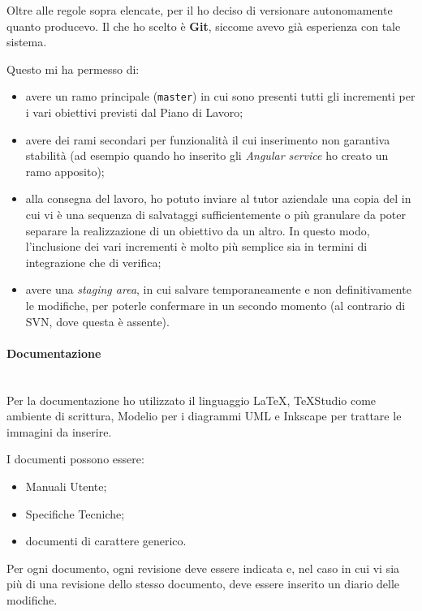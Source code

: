 Oltre alle regole sopra elencate, per il \FREND{} ho deciso di versionare
autonomamente quanto producevo. Il  che ho scelto è \textbf{Git},
siccome avevo già esperienza con tale sistema.

Questo mi ha permesso di:

\begin{itemize}
\item avere un ramo principale (\texttt{master}) in cui sono presenti tutti
  gli incrementi per i vari obiettivi previsti dal Piano di Lavoro;
\item avere dei rami secondari per funzionalità il cui inserimento non
  garantiva stabilità (ad esempio quando ho inserito gli
  \emph{Angular service} ho creato un ramo apposito);
\item alla consegna del lavoro, ho potuto inviare al tutor aziendale una copia
  del  in cui vi è una sequenza di salvataggi
  sufficientemente o più granulare da poter separare la realizzazione di un
  obiettivo da un altro. In questo modo, l'inclusione dei vari
  incrementi è molto più semplice sia in termini di integrazione che di
  verifica;
\item avere una \emph{staging area}, in cui salvare temporaneamente e non
  definitivamente le modifiche, per poterle confermare in un secondo momento
  (al contrario di SVN, dove questa è assente).
\end{itemize}

\paragraph{Documentazione} \mbox{} \\

Per la documentazione ho utilizzato il linguaggio \LaTeX{}, \TeX{}Studio come
ambiente di scrittura, Modelio per i diagrammi UML e Inkscape per trattare le
immagini da inserire.

I documenti possono essere:

\begin{itemize}
\item Manuali Utente;
\item Specifiche Tecniche;
\item documenti di carattere generico.
\end{itemize}

Per ogni documento, ogni revisione deve essere indicata e, nel caso in cui vi
sia più di una revisione dello stesso documento, deve essere inserito un
diario delle modifiche.

